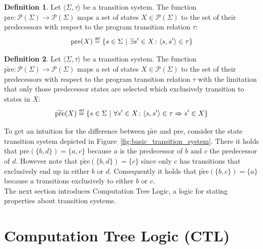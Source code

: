\documentclass[11pt,a4paper,titlepage]{article}
\theoremstyle{definition}
\newtheorem{definition}{Definition}[section]
\newcommand\eqdef{\mathrel{\overset{\makebox[0pt]{\mbox{\normalfont\tiny\sffamily def}}}{=}}}
\begin{document}
\begin{definition}\label{def:pre}
    Let $\langle \Sigma, \tau \rangle$ be a transition system. The function $\text{pre} \colon \mathcal{P}(\Sigma) \to \mathcal{P}(\Sigma)$
    maps a set of states $X \in \mathcal{P}(\Sigma)$ to the set of their predecessors with respect to the program transition
    relation $\tau$:
\begin{equation}
    \text{pre}(X) \eqdef \{s \in \Sigma \ | \ \exists s' \in X \colon \langle s, s' \rangle \in \tau \}  
\end{equation}
\end{definition}


\begin{definition}\label{def:tilde_pre}
    Let $\langle \Sigma, \tau \rangle$ be a transition system. The function $\widetilde{\text{pre}} \colon \mathcal{P}(\Sigma) \to \mathcal{P}(\Sigma)$
    maps a set of states $X \in \mathcal{P}(\Sigma)$ to the set of their predecessors with respect to the program transition
    relation $\tau$ with the limitation that only those predecessor states are selected which exclusively transition to states in $X$:
\begin{equation}
    \widetilde{\text{pre}}(X) \eqdef \{s \in \Sigma \ | \ \forall s' \in X \colon \langle s, s' \rangle \in \tau \Rightarrow s' \in X \}  
\end{equation}
\end{definition}

To get an intuition for the difference between $\widetilde{\text{pre}}$ and $\text{pre}$, consider the state transition system 
depicted in Figure~\ref{fig:basic_transition_system}. There it holds that $\text{pre}(\{b, d\}) = \{a, c\}$ 
because $a$ is the predecessor of $b$ and $c$ the predecessor of $d$. 
However note that $\widetilde{\text{pre}}(\{b, d\}) = \{c\}$ since only $c$ has 
transitions that exclusively end up in either $b$ or $d$. 
Consequently it holds that $\widetilde{\text{pre}}(\{b, c\}) = \{a\}$ because $a$ transitions exclusively to either $b$ or $c$.\\

The next section introduces Computation Tree Logic, 
a logic for stating properties about transition systems.  

\section{Computation Tree Logic (CTL)}\label{sec:computation_tree_logic}
\end{document}

